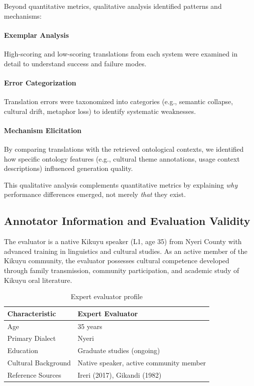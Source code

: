 Beyond quantitative metrics, qualitative analysis identified patterns and mechanisms:

\paragraph{Exemplar Analysis} High-scoring and low-scoring translations from each system were examined in detail to understand success and failure modes.

\paragraph{Error Categorization} Translation errors were taxonomized into categories (e.g., semantic collapse, cultural drift, metaphor loss) to identify systematic weaknesses.

\paragraph{Mechanism Elicitation} By comparing translations with the retrieved ontological contexts, we identified how specific ontology features (e.g., cultural theme annotations, usage context descriptions) influenced generation quality.

This qualitative analysis complements quantitative metrics by explaining \emph{why} performance differences emerged, not merely \emph{that} they exist.

\subsection{Annotator Information and Evaluation Validity}
\label{subsec:annotator_info}

The evaluator is a native Kikuyu speaker (L1, age 35) from Nyeri County with advanced training in linguistics and cultural studies. As an active member of the Kikuyu community, the evaluator possesses cultural competence developed through family transmission, community participation, and academic study of Kikuyu oral literature.

\begin{table}[h]
\centering
\begin{tabular}{ll}
\hline
\textbf{Characteristic} & \textbf{Expert Evaluator} \\
\hline
Age & 35 years \\
Primary Dialect & Nyeri \\
Education & Graduate studies (ongoing) \\
Cultural Background & Native speaker, active community member \\
Reference Sources & Ireri (2017), Gikandi (1982) \\
\hline
\end{tabular}
\caption{Expert evaluator profile}
\label{tab:evaluator_demographics}
\end{table}

